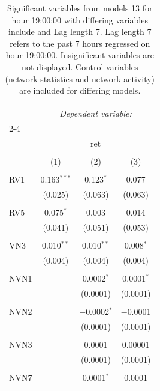
\begin{table}[!htbp] \centering 
  \caption{Significant variables from models 13 for hour 19:00:00 with differing variables include 
                               and Lag length 7. Lag length 7 refers to the past 7 hours regressed on hour 19:00:00. 
                               Insignificant variables are not displayed. 
                               Control variables (network statistics and network activity) are 
                               included for differing models.} 
  \label{RVmodels2_t_hourlagged6} 
\scriptsize 
\begin{tabular}{@{\extracolsep{5pt}}lccc} 
\\[-1.8ex]\hline 
\hline \\[-1.8ex] 
 & \multicolumn{3}{c}{\textit{Dependent variable:}} \\ 
\cline{2-4} 
\\[-1.8ex] & \multicolumn{3}{c}{ret} \\ 
\\[-1.8ex] & (1) & (2) & (3)\\ 
\hline \\[-1.8ex] 
 RV1 & 0.163$^{***}$ & 0.123$^{*}$ & 0.077 \\ 
  & (0.025) & (0.063) & (0.063) \\ 
  & & & \\ 
 RV5 & 0.075$^{*}$ & 0.003 & 0.014 \\ 
  & (0.041) & (0.051) & (0.053) \\ 
  & & & \\ 
 VN3 & 0.010$^{**}$ & 0.010$^{**}$ & 0.008$^{*}$ \\ 
  & (0.004) & (0.004) & (0.004) \\ 
  & & & \\ 
 NVN1 &  & 0.0002$^{*}$ & 0.0001$^{*}$ \\ 
  &  & (0.0001) & (0.0001) \\ 
  & & & \\ 
 NVN2 &  & $-$0.0002$^{*}$ & $-$0.0001 \\ 
  &  & (0.0001) & (0.0001) \\ 
  & & & \\ 
 NVN3 &  & 0.0001 & 0.00001 \\ 
  &  & (0.0001) & (0.0001) \\ 
  & & & \\ 
 NVN7 &  & 0.0001$^{*}$ & 0.0001 \\ 

\end{tabular}
\end{table}
